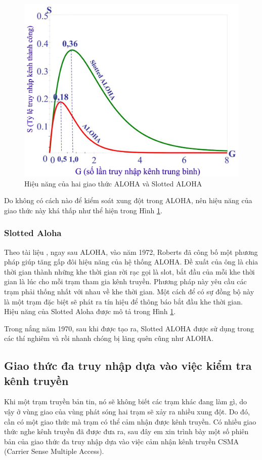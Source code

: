 \begin{figure}[h]
\begin{center}
\includegraphics[scale=0.3]{image/efficiency_aloha}
\end{center}
\caption{Hiệu năng của hai giao thức ALOHA và Slotted ALOHA}
\label{efficiency_aloha}
\end{figure}
\par 
Do không có cách nào để kiểm soát xung đột trong ALOHA, nên hiệu năng của giao thức này khá thấp như thể hiện trong Hình \ref{efficiency_aloha}{}.
\subsubsection{Slotted Aloha}
Theo tài liệu \cite{6}, ngay sau ALOHA, vào năm 1972, Roberts đã công bố một phương pháp giúp tăng gấp đôi hiệu năng của hệ thống ALOHA. Đề xuất của ông là chia thời gian thành những khe thời gian rời rạc gọi là slot, bắt đầu của mỗi khe thời gian là lúc cho mỗi trạm tham gia kênh truyền. Phương pháp này yêu cầu các trạm phải thống nhất với nhau về khe thời gian. Một cách để có sự đồng bộ này là một trạm đặc biệt sẽ phát ra tín hiệu để thông báo bắt đầu khe thời gian. Hiệu năng của Slotted Aloha được mô tả trong Hình \ref{efficiency_aloha}{}.
\par 
Trong nắng năm 1970, sau khi được tạo ra, Slotted ALOHA được sử dụng trong các thí nghiêm và rồi nhanh chóng bị lãng quên cũng như ALOHA.
\subsection{Giao thức đa truy nhập dựa vào việc kiểm tra kênh truyền} 
Khi một trạm truyền bản tin, nó sẽ không biết các trạm khác đang làm gì, do vậy ở vùng giao của vùng phát sóng hai trạm sẽ xảy ra nhiều xung đột. Do đó, cần có một giao thức mà trạm có thể cảm nhận được kênh truyền. Có nhiều giao thức nghe kênh truyền đã được đưa ra, sau đây em xin trình bày một số phiên bản của giao thức đa truy nhập dựa vào việc cảm nhận kênh truyền CSMA (Carrier Sense Multiple Access).
